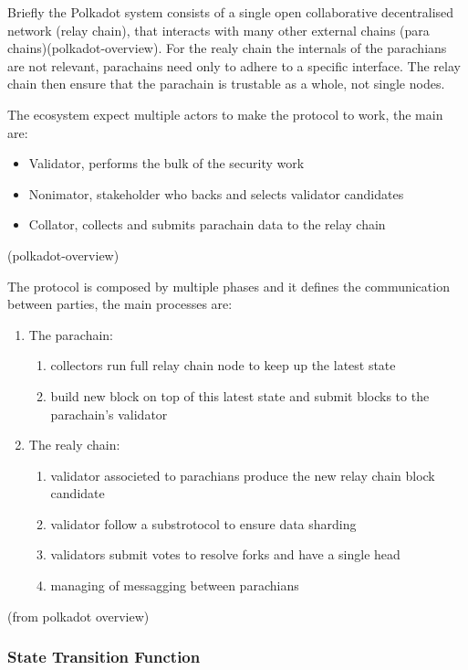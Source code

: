 \documentclass[../main.tex]{subfiles}
\begin{document}
Briefly the Polkadot system consists of a single open collaborative decentralised network (relay chain), that interacts with many other external chains (para chains)(polkadot-overview). For the realy chain the internals of the parachians are not relevant, parachains need only to adhere to a specific interface. The relay chain then ensure that the parachain is trustable as a whole, not single nodes.

The ecosystem expect multiple actors to make the protocol to work, the main are:
\begin{itemize}
  \item Validator, performs the bulk of the security work
  \item Nonimator, stakeholder who backs and selects validator candidates
  \item Collator, collects and submits parachain data to the relay chain
\end{itemize}
(polkadot-overview)

The protocol is composed by multiple phases and it defines the communication between parties, the main processes are:

\begin{enumerate}
  \item The parachain:
        \begin{enumerate}
                \item collectors run full relay chain node to keep up the latest state
                \item build new block on top of this latest state and submit blocks to the parachain's validator
        \end{enumerate}
  \item The realy chain:
    \begin{enumerate}
      \item validator associeted to parachians produce the new relay chain block candidate
      \item validator follow a substrotocol to ensure data sharding
      \item validators submit votes to resolve forks and have a single head
      \item managing of messagging between parachians
    \end{enumerate}
\end{enumerate}
(from polkadot overview)

\subsubsection{State Transition Function}
\end{document}
